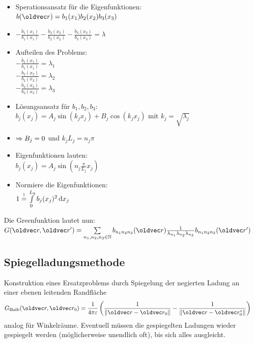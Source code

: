 \documentclass[6pt,a4paper]{scrartcl}
\let\vec\oldvec
\begin{document}
\begin{multicols}{4}
	\begin{itemize}
		\item Sperationsansatz für die Eigenfunktionen: \\
		$b(\vec r) = b_1 (x_1) b_2(x_2) b_3(x_3)$
		\item $- \frac{\ddot b_1(x_1)}{b_1 (x_1)} - \frac{\ddot b_2(x_2)}{b_2 (x_2)}  - \frac{\ddot b_3(x_3)}{b_3 (x_3)} = \lambda$
		\item Aufteilen des Problems: \\
		$- \frac{\ddot b_1(x_1)}{b_1 (x_1)} = \lambda_1$ \\
		$- \frac{\ddot b_2(x_2)}{b_2 (x_2)} = \lambda_2$ \\
		$- \frac{\ddot b_3(x_3)}{b_3 (x_3)} = \lambda_3$
		\item Lösungsansatz für $b_1, b_2, b_3$: \\
		$b_j (x_j) = A_j \sin(k_j x_j) + B_j \cos (k_j x_j)$ mit $k_j = \sqrt{\lambda_j}$
		\item $\Rightarrow B_j = 0$ und $k_j L_j = n_j \pi$
		\item Eigenfunktionen lauten: \\
		$b_j ( x_j ) = A_j \sin (n_j \frac{\pi}{L_j} x_j)$
		\item Normiere die Eigenfunktionen: \\
			$1 \overset{!}{=} \int \limits_0^{L_k} b_j (x_j)^2 \diff x_j$
	\end{itemize}
	
	Die Greenfunktion lautet nun: \\
	$G(\vec r, \vec r') = \sum \limits_{n_1, n_2 , n_3 \in \mathbb N} b_{n_1 n_2 n_3} (\vec r ) \frac{1}{\lambda_{n_1}\lambda_{n_2}\lambda_{n_3}} b_{n_1 n_2 n_3} (\vec r' )$
	\subsection*{Spiegelladungsmethode}
	Konstruktion eines Ersatzproblems durch Spiegelung der negierten Ladung an einer ebenen leitenden Randfläche\\
	\begin{align*}
		G_{\text{Halb}}(\vec r, \vec r_0) = \frac{1}{4 \pi \varepsilon} \left( \frac{1}{\norm{\vec r - \vec r_0}} - \frac{1}{\norm{\vec r - \vec r_0^*}}\right)
	\end{align*}
	analog für Winkelräume. Eventuell müssen die gespiegelten Ladungen wieder gespiegelt werden (möglicherweise unendlich oft), bis sich alles ausgleicht.
	

\end{multicols}
\end{document}
